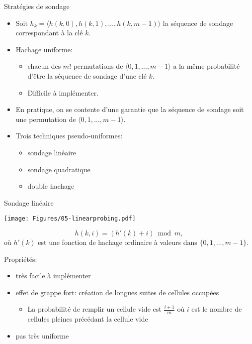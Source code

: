 \begin{frame}{Stratégies de sondage}
\begin{itemize}
\item Soit $h_k=\langle h(k,0), h(k,1), \ldots, h(k,m-1)\rangle$ la séquence de sondage correspondant à la clé $k$.
\item Hachage uniforme:
\begin{itemize}
\item chacun des $m!$ permutations de $\langle
  0,1,\ldots,m-1\rangle$ a la même probabilité d'être la séquence de
  sondage d'une clé $k$.
\item Difficile à implémenter.
\end{itemize}
\item En pratique, on se contente d'une garantie que la séquence de
  sondage soit une permutation de $\langle
  0,1,\ldots,m-1\rangle$.

\bigskip

\item Trois techniques pseudo-uniformes:
\begin{itemize}
\item sondage linéaire
\item sondage quadratique
\item double hachage
\end{itemize}
\end{itemize}

\end{frame}

\begin{frame}{Sondage linéaire}

\centerline{\texttt{[image: Figures/05-linearprobing.pdf]}}

\bigskip

$$h(k,i)=(h'(k)+i) \bmod m,$$
où $h'(k)$ est une fonction de hachage ordinaire à valeurs dans $\{0,1,\ldots,m-1\}$.


Propriétés:
\begin{itemize}
\item très facile à implémenter
\item effet de grappe fort: création de longues suites de cellules occupées
\begin{itemize}
\item La probabilité de remplir un cellule vide est $\frac{i+1}{m}$ où $i$ est le nombre de cellules pleines précédant la cellule vide
\end{itemize}
\item pas très uniforme
\end{itemize}


\end{frame}

